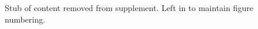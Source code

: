 \begin{figure}

% 
% 

\caption{
Stub of content removed from supplement.
Left in to maintain figure numbering.
}
\label{fig:fitness_complexity_alt}

\end{figure}